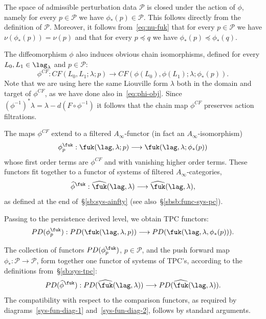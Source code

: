 The space of admissible perturbation data
$\mathcal{P}$ is closed under the action of $\phi$, namely for every
$p \in \mathcal{P}$ we have $\phi_*(p) \in \mathcal{P}$. This follows directly
from the definition of $\mathcal{P}$. Moreover,
it follows from~\eqref{eq:nu-fuk} that for every $p \in \mathcal{P}$ we
have $\nu(\phi_*(p)) = \nu(p)$ and that for every $p \preceq q$ we
have $\phi_*(p) \preceq \phi_*(q)$.

The diffeomorphism $\phi$ also induces obvious chain isomorphisms,
defined for every $L_0, L_1 \in \lag_{\lambda}$ and
$p \in \mathcal{P}$:
\begin{equation} \label{eq:phi-chain} \phi^{CF} : CF(L_0, L_1;
  \lambda; p) \longrightarrow CF(\phi(L_0), \phi(L_1); \lambda;
  \phi_*(p)).
\end{equation}
Note that we are using here the same Liouville form $\lambda$ both in
the domain and target of $\phi^{CF}$, as we have done also
in~\eqref{eq:phi-obj}. Since
$(\phi^{-1})^*\lambda = \lambda - d(F \circ \phi^{-1})$ it follows
that the chain map $\phi^{CF}$ preserves action filtrations.

The maps $\phi^{CF}$ extend to a filtered $A_{\infty}$-functor (in
fact an $A_{\infty}$-isomorphism)
\begin{equation} \label{eq:phi-fun-1} \phi^{\fuk}_p: \fuk(\lag,
  \lambda; p) \longrightarrow \fuk(\lag, \lambda; \phi_*(p))
\end{equation}
whose first order terms are $\phi^{CF}$ and with vanishing higher
order terms. These functors fit together to a functor of systems of
filtered $A_{\infty}$-categories,
$$\widehat{\phi}^{\fuk}: \widehat{\fuk}(\lag, \lambda) \longrightarrow
\widehat{\fuk}(\lag, \lambda),$$ as defined at the end
of~\S\ref{sb:sys-ainfty} (see also~\S\ref{sbsb:func-sys-pc}).

Passing to the persistence derived level, we obtain TPC functors:
\begin{equation} \label{eq:phi-fun-2} PD(\phi^{\fuk}_p): PD(\fuk(\lag,
  \lambda, p)) \longrightarrow PD(\fuk(\lag, \lambda, \phi_*(p))).
\end{equation}

The collection of functors $PD(\phi_p^{\fuk})$, $p \in \mathcal{P}$,
and the push forward map
$\phi_*: \mathcal{P} \longrightarrow \mathcal{P}$, form together one
functor of systems of TPC's, according to the definitions
from~\S\ref{sb:sys-tpc}:
\begin{equation} \label{eq:phi-fun-3} PD(\widehat{\phi}^{\fuk}) :
  PD(\widehat{\fuk}(\lag, \lambda)) \longrightarrow
  PD(\widehat{\fuk}(\lag, \lambda)).
\end{equation}
The compatibility with respect to the comparison functors, as required
by diagrams~\eqref{sys-fun-diag-1} and~\eqref{sys-fun-diag-2}, follows
by standard arguments.

